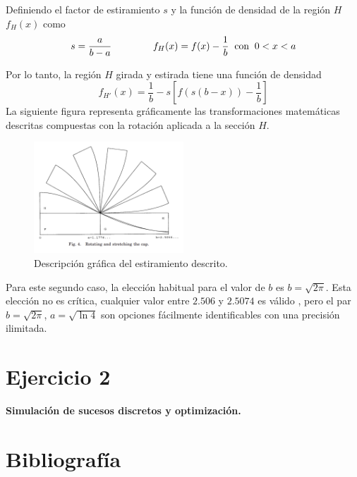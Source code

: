 \documentclass[a4paper,12pt]{article}
\begin{document}
	Definiendo el factor de estiramiento $s$ y la función de densidad de la región $H$ $f_H(x)$ como 
	$$s=\dfrac{a}{b-a} \hspace{1.5cm} f_H(x)=f(x)-\dfrac{1}{b} \hspace{2mm} \text{con} \hspace{2mm} 0<x<a $$
	
	Por lo tanto, la región $H$ girada y estirada tiene una función de densidad
	$$ f_{H'}(x) = \dfrac{1}{b} - s  \left[ f(s (b-x) ) -\dfrac{1}{b} \right] $$ 
	La siguiente figura representa gráficamente las transformaciones matemáticas descritas compuestas con la rotación aplicada a la sección $H$. 
	
	\begin{figure}[H]
		\centering
		\includegraphics[width=0.5\textwidth]{include/stretching_sigmoid.png}
		\caption{Descripción gráfica del estiramiento descrito.}
	\end{figure}
	
	Para este segundo caso, la elección habitual para el valor de $b$ es $b= \sqrt{2\pi}$. Esta elección no es crítica, cualquier valor entre $2.506$ y $2.5074$ es válido \cite{segundo-articulo}, pero el par $b=\sqrt{2\pi}$, $a = \sqrt{\ln 4}$ son opciones fácilmente identificables con una precisión ilimitada.
	
	
	\newpage
	\section*{Ejercicio 2}
	\textbf{Simulación de sucesos discretos y optimización.}
	
	
	\newpage
	\section*{Bibliografía}
	
	
	
\end{document}
